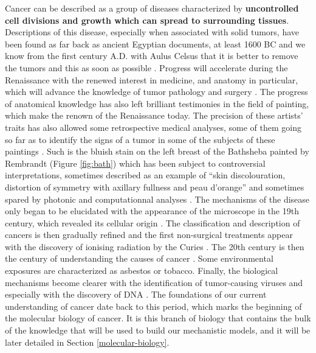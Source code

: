 \documentclass[a4paper,12pt,twoside,onecolumn,openright,final,oldfontcommands]{memoir}
\begin{document}
Cancer can be described as a group of diseases characterized by
\textbf{uncontrolled cell divisions and growth which can spread to
surrounding tissues}. Descriptions of this disease, especially when
associated with solid tumors, have been found as far back as ancient
Egyptian documents, at least 1600 BC and we know from the first century
A.D. with Aulus Celsus that it is better to remove the tumors and this
as soon as possible \citep{hajdu2011note}. Progress will accelerate
during the Renaissance with the renewed interest in medicine, and
anatomy in particular, which will advance the knowledge of tumor
pathology and surgery \citep{hajdu2011note2}. The progress of anatomical
knowledge has also left brilliant testimonies in the field of painting,
which make the renown of the Renaissance today. The precision of these
artists' traits has also allowed some retrospective medical analyses,
some of them going so far as to identify the signs of a tumor in some of
the subjects of these paintings \citep{bianucci2018earliest}. Such is
the bluish stain on the left breast of the Bathsheba painted by
Rembrandt (Figure \ref{fig:bath}) which has been subject to
controversial interpretations, sometimes described as an example of
``skin discolouration, distortion of symmetry with axillary fullness and
peau d'orange'' \citep{braithwaite1983rembrandt} and sometimes spared by
photonic and computationnal analyses \citep{heijblom2014monte}. The
mechanisms of the disease only began to be elucidated with the
appearance of the microscope in the 19th century, which revealed its
cellular origin \citep{hajdu2012note}. The classification and
description of cancers is then gradually refined and the first
non-surgical treatments appear with the discovery of ionising radiation
by the Curies \citep{hajdu2012note2}. The 20th century is then the
century of understanding the causes of cancer
\citep{hajdu2013note, hajdu2013note2}. Some environmental exposures are
characterized as asbestos or tobacco. Finally, the biological mechanisms
become clearer with the identification of tumor-causing viruses and
especially with the discovery of DNA \citep{watson1953molecular}. The
foundations of our current understanding of cancer date back to this
period, which marks the beginning of the molecular biology of cancer. It
is this branch of biology that contains the bulk of the knowledge that
will be used to build our mechanistic models, and it will be later
detailed in Section \ref{molecular-biology}.
\end{document}
